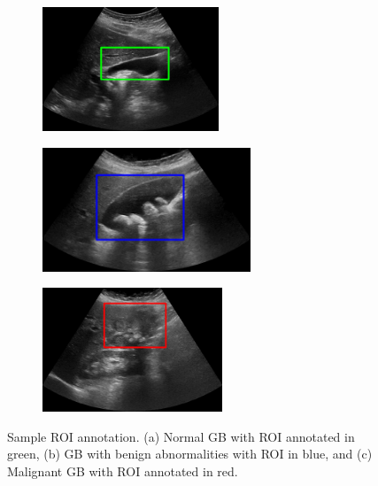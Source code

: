 \begin{figure}[t]
    \centering
     \begin{subfigure}[b]{0.3\linewidth}
		\centering
		\includegraphics[width=\linewidth,height=10em]{figs/gbcnet/bbs-nml.png}
		\caption{}
	\end{subfigure}
    \begin{subfigure}[b]{0.3\linewidth}
		\centering
		\includegraphics[width=\linewidth,height=10em]{figs/gbcnet/bbs-ben.png}
		\caption{}
	\end{subfigure}
    \begin{subfigure}[b]{0.3\linewidth}
		\centering
		\includegraphics[width=\linewidth,height=10em]{figs/gbcnet/bbs-mlg.png}
		\caption{}
	\end{subfigure}
   \caption[Sample ROI annotation in USG images]{Sample ROI annotation. (a) Normal GB with ROI annotated in green, (b) GB with benign abnormalities with ROI in blue, and (c) Malignant GB with ROI annotated in red. }
    \label{fig:bb_sample}
\end{figure}
%
